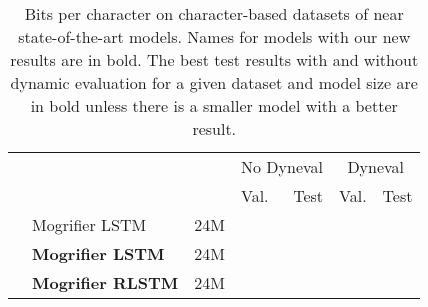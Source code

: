 \begin{table}
  \setlength{\abovecaptionskip}{0.2\baselineskip}
  \caption[Bits per character on character-based datasets of near state-of-the-art models.]{Bits per character on character-based datasets of near state-of-the-art models.
Names for models with our new results are in bold.
The best test results with and without dynamic evaluation for a given dataset and model size are in bold unless there is a smaller model with a better result.}
  \label{tab:cb-character-results}

  \centering
  \small
  \begin{tabular}{@{}llrllll@{}}
    & & & \multicolumn{2}{c}{No Dyneval} & \multicolumn{2}{c}{Dyneval} \\
    \cmidrule(lr){4-5} \cmidrule(lr){6-7}
    & & & Val. & \multicolumn{1}{r}{Test} & Val. & \multicolumn{1}{r}{Test} \\
    \midrule
    \parbox[t]{5mm}{}
    & Mogrifier LSTM \citep{melis2019mogrifier} & 24M
        &  & 
        &  &  \\
    & \textbf{Mogrifier LSTM} & 24M
        &  & 
        &  &  \\
    & \textbf{Mogrifier RLSTM} & 24M
        &  & 
        &  &  \\


\end{tabular}
\end{table}
